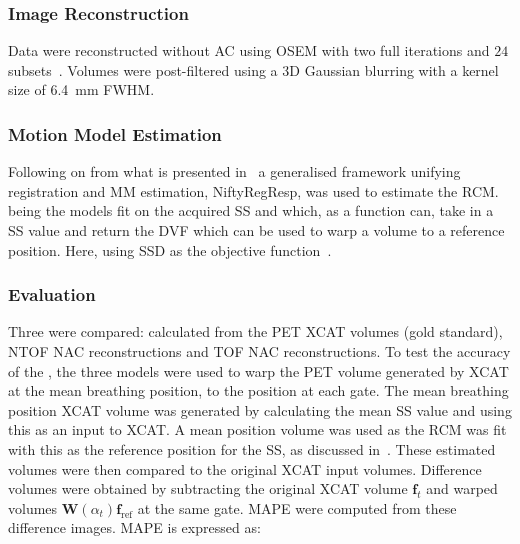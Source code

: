             \subsubsection{Image Reconstruction} \label{sec:impact_of_tof_on_respiratory_motion_model_estimation_using_pre_gated_no_intra_cycle_motion_nac_pet_methods_image_reconstruction}
                Data were reconstructed without \gls{AC} using \gls{OSEM} with two full iterations and $24$ subsets~. Volumes were post-filtered using a \gls{3D} Gaussian blurring with a kernel size of \SI{6.4}{\milli\metre} \gls{FWHM}.
            
            \subsubsection{Motion Model Estimation} \label{sec:impact_of_tof_on_respiratory_motion_model_estimation_using_pre_gated_no_intra_cycle_motion_nac_pet_methods_motion_model_estimation}
                Following on from what is presented in~ a generalised framework unifying registration and \gls{MM} estimation, NiftyRegResp, was used to estimate the \gls{RCM}.  being the models fit on the acquired \gls{SS} and  which, as a function can, take in a \gls{SS} value and return the \gls{DVF} which can be used to warp a volume to a reference position. Here, using \gls{SSD} as the objective function~.
                
            \subsubsection{Evaluation} \label{sec:impact_of_tof_on_respiratory_motion_model_estimation_using_pre_gated_no_intra_cycle_motion_nac_pet_methods_evaluation}
                Three  were compared: calculated from the \gls{PET} \gls{XCAT} volumes (gold standard), \gls{NTOF} \gls{NAC} reconstructions and \gls{TOF} \gls{NAC} reconstructions. To test the accuracy of the , the three models were used to warp the \gls{PET} volume generated by \gls{XCAT} at the mean breathing position, to the position at each gate. The mean breathing position \gls{XCAT} volume was generated by calculating the mean \gls{SS} value and using this as an input to \gls{XCAT}. A mean position volume was used as the \gls{RCM} was fit with this as the reference position for the \gls{SS}, as discussed in~. These estimated volumes were then compared to the original \gls{XCAT} input volumes. Difference volumes were obtained by subtracting the original \gls{XCAT} volume $\mathbf{f}_t$ and warped volumes $\mathbf{W}(\alpha_t) \mathbf{f}_\mathrm{ref}$ at the same gate. \gls{MAPE} were computed from these difference images. \gls{MAPE} is expressed as:
                
